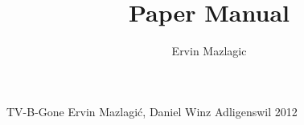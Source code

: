 \documentclass[a4paper,
               10pt,
               fleqn]{article}
\author{Ervin Mazlagic}
\title{Paper Manual}
\begin{document}
         {TV-B-Gone}
         {Ervin Mazlagi\'c, Daniel Winz}
         {Adligenswil}
         {2012}

\tableofcontents
\newpage

\tableofcontents

% 
% 
% 
% 
\end{document}
